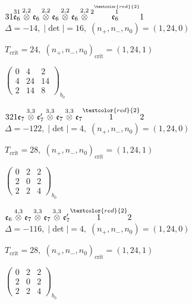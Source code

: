 \documentclass[10pt]{article}
\begin{document}
$31\overset{31}{\mathfrak{e}_6}\overset{2,2}{\otimes}\mathfrak{e}_6\overset{2,2}{\otimes}\mathfrak{e}_6\overset{2,2}{\otimes}\mathfrak{e}_6\overset{2,2}{\otimes}\overset{2\overset{\textcolor{red}{2}}{1}}{\mathfrak{e}_6}1$ \quad $\Delta=-14,\; |\det|=16,\; (n_+,n_-,n_0)=(1,24,0)$

\hspace{1em}$T_{\text{crit}}=24,\; (n_+,n_-,n_0)_{\text{crit}}=(1,24,1)$

\hspace{2em}$\left(\begin{smallmatrix}0 & 4 & 2 \\ 4 & 24 & 14 \\ 2 & 14 & 8\end{smallmatrix}\right)_{\!b_0}$

\smallskip

$321\mathfrak{e}_7\overset{3,3}{\otimes}\mathfrak{e}_7'\overset{3,3}{\otimes}\mathfrak{e}_7\overset{3,3}{\otimes}\mathfrak{e}_7\overset{\textcolor{red}{2}}{1}2$ \quad $\Delta=-122,\; |\det|=4,\; (n_+,n_-,n_0)=(1,24,0)$

\hspace{1em}$T_{\text{crit}}=28,\; (n_+,n_-,n_0)_{\text{crit}}=(1,24,1)$

\hspace{2em}$\left(\begin{smallmatrix}0 & 2 & 2 \\ 2 & 0 & 2 \\ 2 & 2 & 4\end{smallmatrix}\right)_{\!b_0}$

\smallskip

$\mathfrak{e}_6\overset{4,3}{\otimes}\mathfrak{e}_7\overset{3,3}{\otimes}\mathfrak{e}_7\overset{3,3}{\otimes}\mathfrak{e}_7'\overset{\textcolor{red}{2}}{1}2$ \quad $\Delta=-116,\; |\det|=4,\; (n_+,n_-,n_0)=(1,24,0)$

\hspace{1em}$T_{\text{crit}}=28,\; (n_+,n_-,n_0)_{\text{crit}}=(1,24,1)$

\hspace{2em}$\left(\begin{smallmatrix}0 & 2 & 2 \\ 2 & 0 & 2 \\ 2 & 2 & 4\end{smallmatrix}\right)_{\!b_0}$
\end{document}
